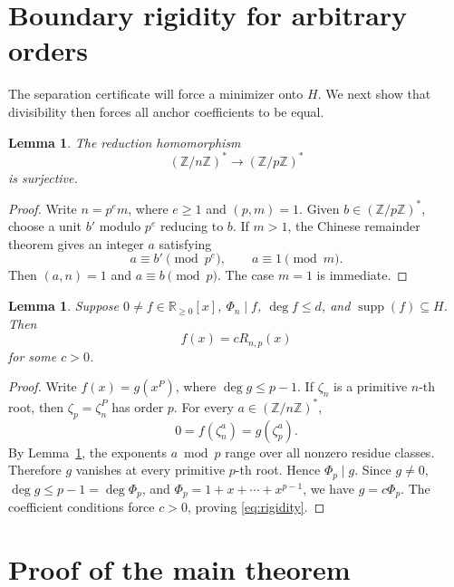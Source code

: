 \documentclass[11pt]{article}
\newtheorem{lemma}[theorem]{Lemma}
\numberwithin{equation}{section}
\begin{document}
\section{Boundary rigidity for arbitrary orders}\label{sec:rigidity}

The separation certificate will force a minimizer onto $H$. We next show that
divisibility then forces all anchor coefficients to be equal.

\begin{lemma}\label{lem:surjective}
The reduction homomorphism
\begin{equation}
(\mathbb Z/n\mathbb Z)^*\longrightarrow(\mathbb Z/p\mathbb Z)^*
\label{eq:reduction}
\end{equation}
is surjective.
\end{lemma}

\begin{proof}
Write $n=p^em$, where $e\geq1$ and $(p,m)=1$. Given
$b\in(\mathbb Z/p\mathbb Z)^*$, choose a unit $b'$ modulo $p^e$ reducing to
$b$. If $m>1$, the Chinese remainder theorem gives an integer $a$ satisfying
\[
a\equiv b'\pmod{p^e},
\qquad
a\equiv1\pmod m.
\]
Then $(a,n)=1$ and $a\equiv b\pmod p$. The case $m=1$ is immediate.
\end{proof}

\begin{lemma}\label{lem:rigidity}
Suppose $0\ne f\in\mathbb R_{\geq0}[x]$, $\Phi_n\mid f$,
$\deg f\leq d$, and $\operatorname{supp}(f)\subseteq H$. Then
\begin{equation}
f(x)=cR_{n,p}(x)
\label{eq:rigidity}
\end{equation}
for some $c>0$.
\end{lemma}

\begin{proof}
Write $f(x)=g(x^P)$, where $\deg g\leq p-1$. If $\zeta_n$ is a primitive
$n$-th root, then $\zeta_p=\zeta_n^P$ has order $p$. For every
$a\in(\mathbb Z/n\mathbb Z)^*$,
\begin{equation}
0=f(\zeta_n^a)=g(\zeta_p^a).
\label{eq:groot}
\end{equation}
By Lemma~\ref{lem:surjective}, the exponents $a\bmod p$ range over all
nonzero residue classes. Therefore $g$ vanishes at every primitive $p$-th
root. Hence $\Phi_p\mid g$. Since $g\ne0$,
$\deg g\leq p-1=\deg\Phi_p$, and
$\Phi_p=1+x+\cdots+x^{p-1}$, we have $g=c\Phi_p$. The coefficient
conditions force $c>0$, proving \eqref{eq:rigidity}.
\end{proof}

\section{Proof of the main theorem}\label{sec:proof}
\end{document}
